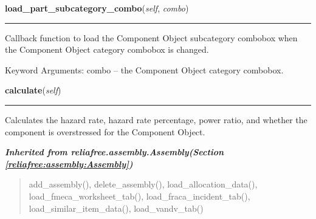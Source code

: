     \label{reliafree:component:Component:load_part_subcategory_combo}

    \vspace{0.5ex}

\hspace{.8\funcindent}\begin{boxedminipage}{\funcwidth}

    \raggedright \textbf{load\_part\_subcategory\_combo}(\textit{self}, \textit{combo})

    \vspace{-1.5ex}

    \rule{\textwidth}{0.5\fboxrule}
\setlength{\parskip}{2ex}
    Callback function to load the Component Object subcategory combobox 
    when the Component Object category combobox is changed.

    Keyword Arguments: combo -- the Component Object category combobox.

\setlength{\parskip}{1ex}
    \end{boxedminipage}

    \label{reliafree:component:Component:calculate}

    \vspace{0.5ex}

\hspace{.8\funcindent}\begin{boxedminipage}{\funcwidth}

    \raggedright \textbf{calculate}(\textit{self})

    \vspace{-1.5ex}

    \rule{\textwidth}{0.5\fboxrule}
\setlength{\parskip}{2ex}
    Calculates the hazard rate, hazard rate percentage, power ratio, and 
    whether the component is overstressed for the Component Object.

\setlength{\parskip}{1ex}
    \end{boxedminipage}


\large{\textbf{\textit{Inherited from reliafree.assembly.Assembly\textit{(Section \ref{reliafree:assembly:Assembly})}}}}

\begin{quote}
add\_assembly(), delete\_assembly(), load\_allocation\_data(), load\_fmeca\_worksheet\_tab(), load\_fraca\_incident\_tab(), load\_similar\_item\_data(), load\_vandv\_tab()
\end{quote}

